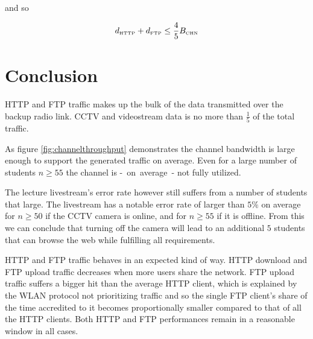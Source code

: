 \documentclass[a4paper]{scrreprt}
\begin{document}
			and so
			
			\[d_\text{\tiny HTTP} + d_\text{\tiny FTP}\leq \frac{4}{5}B_\text{\tiny CHN}\]					
			
%			

		 \section{Conclusion}
		 	HTTP and FTP traffic makes up the bulk of the data transmitted over the backup radio link. CCTV and videostream data is no more than $\frac{1}{5}$ of the total traffic. 
		 	
		 	As figure \ref{fig:channelthroughput} demonstrates the channel bandwidth is large enough to support the generated traffic on average. Even for a large number of students $n\geq 55$ the channel is -~on~average~- not fully utilized. 
		 	
		 	The lecture livestream's error rate however still suffers from a number of students that large. The livestream has a notable error rate of larger than $5\%$ on average for $n\geq 50$ if the CCTV camera is online, and for $n\geq 55$ if it is offline. From this we can conclude that turning off the camera will lead to an additional $5$ students that can browse the web while fulfilling all requirements.
		 	
		 	HTTP and FTP traffic behaves in an expected kind of way. HTTP download and FTP upload traffic decreases when more users share the network. FTP upload traffic suffers a bigger hit than the average HTTP client, which is explained by the WLAN protocol not prioritizing traffic and so the single FTP client's share of the time accredited to it becomes proportionally smaller compared to that of all the HTTP clients. Both HTTP and FTP performances remain in a reasonable window in all cases.		 			 	
		 	
\end{document}
